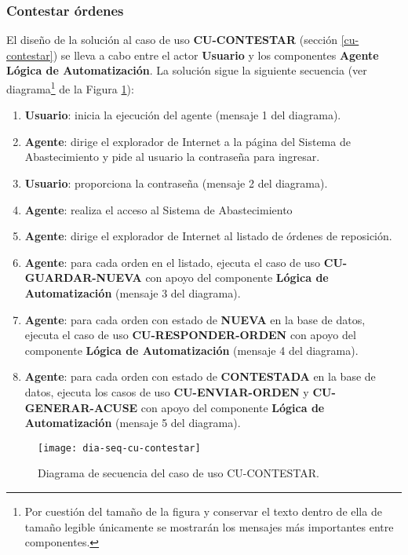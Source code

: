 \subsubsection{Contestar órdenes}
El diseño de la solución al caso de uso \textbf{CU-CONTESTAR} (sección \ref{cu-contestar}) se lleva a cabo entre el actor \textbf{Usuario} y los componentes \textbf{Agente} \textbf{Lógica de Automatización}. La solución sigue la siguiente secuencia (ver diagrama\footnote{Por cuestión del tamaño de la figura y conservar el texto dentro de ella de tamaño legible únicamente se mostrarán los mensajes más importantes entre componentes.} de la Figura \ref{fig:dia-seq-cu-contestar}):
\begin{enumerate}
	\item \textbf{Usuario}: inicia la ejecución del agente (mensaje 1 del diagrama).
	\item \textbf{Agente}: dirige el explorador de Internet a la página del Sistema de Abastecimiento y pide al usuario la contraseña para ingresar.
	\item \textbf{Usuario}: proporciona la contraseña (mensaje 2 del diagrama).
	\item \textbf{Agente}: realiza el acceso al Sistema de Abastecimiento
	\item \textbf{Agente}: dirige el explorador de Internet al listado de órdenes de reposición.
	\item \textbf{Agente}: para cada orden en el listado, ejecuta el caso de uso \textbf{CU-GUARDAR-NUEVA} con apoyo del componente \textbf{Lógica de Automatización} (mensaje 3 del diagrama).
	\item \textbf{Agente}: para cada orden con estado de \textbf{NUEVA} en la base de datos, ejecuta el caso de uso \textbf{CU-RESPONDER-ORDEN} con apoyo del componente \textbf{Lógica de Automatización} (mensaje 4 del diagrama).
	\item \textbf{Agente}: para cada orden con estado de \textbf{CONTESTADA} en la base de datos, ejecuta los casos de uso \textbf{CU-ENVIAR-ORDEN} y \textbf{CU-GENERAR-ACUSE} con apoyo del componente \textbf{Lógica de Automatización} (mensaje 5 del diagrama).
\end{enumerate}

\begin{figure}[h]
	\centering
	\texttt{[image: dia-seq-cu-contestar]}
	\caption{Diagrama de secuencia del caso de uso CU-CONTESTAR.}
	\label{fig:dia-seq-cu-contestar}
\end{figure}

